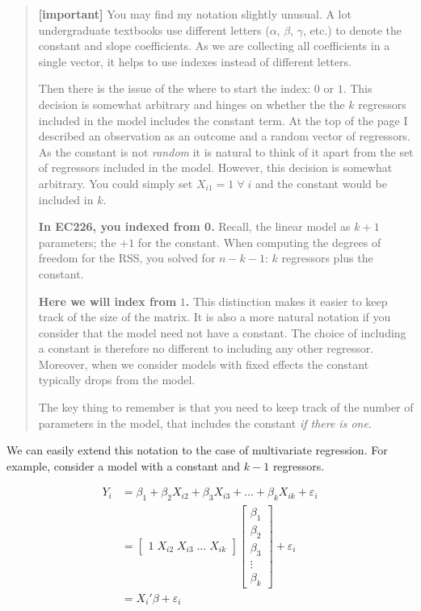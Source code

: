 \documentclass[
  letterpaper,
  DIV=11,
  numbers=noendperiod]{scrreprt}
\begin{document}
\begin{quote}
\textbf{{[}important{]}} You may find my notation slightly unusual. A
lot undergraduate textbooks use different letters (\(\alpha\),
\(\beta\), \(\gamma\), etc.) to denote the constant and slope
coefficients. As we are collecting all coefficients in a single vector,
it helps to use indexes instead of different letters.

Then there is the issue of the where to start the index: \(0\) or \(1\).
This decision is somewhat arbitrary and hinges on whether the the \(k\)
regressors included in the model includes the constant term. At the top
of the page I described an observation as an outcome and a random vector
of regressors. As the constant is not \emph{random} it is natural to
think of it apart from the set of regressors included in the model.
However, this decision is somewhat arbitrary. You could simply set
\(X_{i1} = 1\;\forall\;i\) and the constant would be included in \(k\).

\textbf{In EC226, you indexed from 0.} Recall, the linear model as
\(k+1\) parameters; the \(+1\) for the constant. When computing the
degrees of freedom for the RSS, you solved for \(n-k-1\): \(k\)
regressors plus the constant.

\textbf{Here we will index from} \(1\)\textbf{.} This distinction makes
it easier to keep track of the size of the matrix. It is also a more
natural notation if you consider that the model need not have a
constant. The choice of including a constant is therefore no different
to including any other regressor. Moreover, when we consider models with
fixed effects the constant typically drops from the model.

The key thing to remember is that you need to keep track of the number
of parameters in the model, that includes the constant \emph{if there is
one}.
\end{quote}

We can easily extend this notation to the case of multivariate
regression. For example, consider a model with a constant and \(k-1\)
regressors.

\[
\begin{align} Y_i &= \beta_1 + \beta_2 X_{i2} + \beta_3 X_{i3} + \ldots + \beta_k X_{ik} + \varepsilon_i \\
&= \begin{bmatrix} 1\; X_{i2}\; X_{i3}\; \dots\; X_{ik} \end{bmatrix} \begin{bmatrix} \beta_1\\ \beta_2\\ \beta_3\\ \vdots\\ \beta_k\end{bmatrix} + \varepsilon_i \\
&=X_i'\beta + \varepsilon_i
\end{align}
\]
\end{document}
